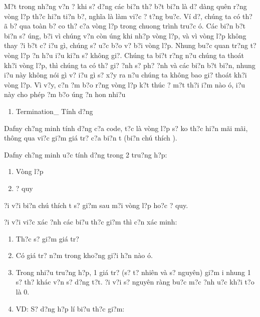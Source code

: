 \documentclass{article} %
\begin{document}
M?t trong nh?ng v?n {\dj}? khi s? d?ng c\'{a}c bi?n th? b?t bi?n l\`{a} d? d\`{a}ng qu\^{e}n r?ng v\`{o}ng l?p th?c hi?n ti?n b?, ngh\~{i}a l\`{a} l\`{a}m vi?c ? t?ng bu?c. V\'{i} d?, ch\'{u}ng ta c\'{o} th? {\dj}\~{a} b? qua to\`{a}n b? co th? c?a v\`{o}ng l?p trong chuong tr\`{i}nh tru?c {\dj}\'{o}. C\'{a}c bi?n b?t bi?n s? {\dj}\'{u}ng, b?i v\`{i} ch\'{u}ng v?n c\`{o}n {\dj}\'{u}ng khi nh?p v\`{o}ng l?p, v\`{a} v\`{i} v\`{o}ng l?p kh\^{o}ng thay {\dj}?i b?t c? {\dj}i?u g\`{i}, ch\'{u}ng s? {\dj}u?c b?o v? b?i v\`{o}ng l?p. Nhung bu?c quan tr?ng t? v\`{o}ng l?p {\dj}?n h?u {\dj}i?u ki?n s? kh\^{o}ng gi?. Ch\'{u}ng ta bi?t r?ng n?u ch\'{u}ng ta tho\'{a}t kh?i v\`{o}ng l?p, th\`{i} ch\'{u}ng ta c\'{o} th? gi? {\dj}?nh s? ph? {\dj}?nh v\`{a} c\'{a}c bi?n b?t bi?n, nhung {\dj}i?u n\`{a}y kh\^{o}ng n\'{o}i g\`{i} v? {\dj}i?u g\`{i} s? x?y ra n?u ch\'{u}ng ta kh\^{o}ng bao gi? tho\'{a}t kh?i v\`{o}ng l?p. V\`{i} v?y, c?n {\dj}?m b?o r?ng v\`{o}ng l?p k?t th\'{u}c ? m?t th?i {\dj}i?m n\`{a}o {\dj}\'{o}, {\dj}i?u n\`{a}y cho ph\'{e}p {\dj}?m b?o {\dj}\'{u}ng {\dj}?n hon nhi?u 

\begin{enumerate}
\item  Termination\_ T\'{i}nh d?ng
\end{enumerate}

Dafny ch?ng minh t\'{i}nh d?ng c?a code, t?c l\`{a} v\`{o}ng l?p s? ko th?c hi?n m\~{a}i m\~{a}i, th\^{o}ng qua vi?c gi?m gi\'{a} tr? c?a bi?n t (bi?n ch\'{u} th\'{i}ch ).

\noindent Dafny ch?ng minh {\dj}u?c t\'{i}nh d?ng trong 2 tru?ng h?p: 

\begin{enumerate}
\item  V\`{o}ng l?p

\item  {\DJ}? quy
\end{enumerate}

\noindent {\DJ}?i v?i bi?n ch\'{u} th\'{i}ch t s? gi?m sau m?i v\`{o}ng l?p ho?c {\dj}? quy.

\noindent {\DJ}?i v?i vi?c x\'{a}c {\dj}?nh c\'{a}c bi?u th?c gi?m th\`{i} c?n x\'{a}c minh:

\begin{enumerate}
\item  Th?c s? gi?m gi\'{a} tr?

\item  C\'{o} gi\'{a} tr? n?m trong kho?ng gi?i h?n n\`{a}o {\dj}\'{o}.

\item  Trong nhi?u tru?ng h?p, 1 gi\'{a} tr? (s? t? nhi\^{e}n v\`{a} s? nguy\^{e}n) gi?m {\dj}i nhung 1 s? th? kh\'{a}c v?n s? d?ng t?t. {\DJ}?i v?i s? nguy\^{e}n r\`{a}ng bu?c m?c {\dj}?nh {\dj}u?c kh?i t?o l\`{a} 0.

\item  VD: S? d?ng h?p l\'{i} bi?u th?c gi?m:
\end{enumerate}
\end{document}
